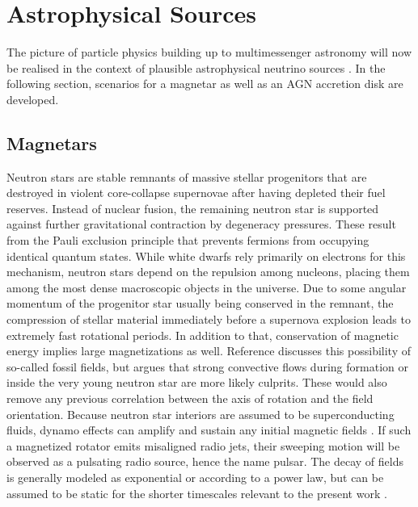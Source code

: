 \section{Astrophysical Sources}
\label{sec:sources}

\enlargethispage{\baselineskip}

The picture of particle physics building up to multimessenger astronomy will now be realised in the context of plausible astrophysical
neutrino sources \cite{Becker_2008}. In the following section, scenarios for a magnetar as well as an AGN accretion disk are developed.



\subsection{Magnetars}
\label{sub:magnetars}

Neutron stars are stable remnants of massive stellar progenitors that are destroyed in violent core-collapse supernovae after having
depleted their fuel reserves. Instead of nuclear fusion, the remaining neutron star is supported against further gravitational
contraction by degeneracy pressures. These result from the Pauli exclusion principle that prevents fermions from occupying identical
quantum states. While white dwarfs rely primarily on electrons for this mechanism, neutron stars depend on the repulsion among
nucleons, placing them among the most dense macroscopic objects in the universe. Due to some angular momentum of the progenitor
star usually being conserved in the remnant, the compression of stellar material immediately before a supernova explosion leads to
extremely fast rotational periods. In addition to that, conservation of magnetic energy implies large magnetizations as well.
Reference \cite{Thompson_1993} discusses this possibility of so-called fossil fields, but argues that strong convective flows
during formation or inside the very young neutron star are more likely culprits. These would also remove any previous correlation
between the axis of rotation and the field orientation. Because neutron star interiors are assumed to be superconducting fluids,
dynamo effects can amplify and sustain any initial magnetic fields \cite{Haskell_2018}. If such a magnetized rotator emits misaligned
radio jets, their sweeping motion will be observed as a pulsating radio source, hence the name pulsar. The decay of fields is generally
modeled as exponential or according to a power law, but can be assumed to be static for the shorter timescales relevant to the present
work \cite{Sang_1990}.

